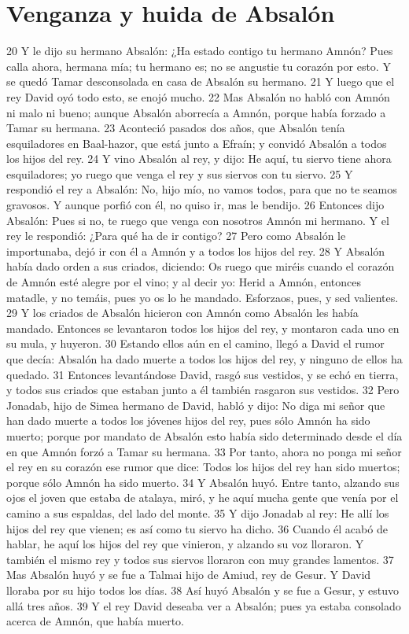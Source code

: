 \section*{Venganza y huida de Absalón}

20 Y le dijo su hermano Absalón: ¿Ha estado contigo tu hermano Amnón? Pues calla ahora, hermana mía; tu hermano es; no se angustie tu corazón por esto. Y se quedó Tamar desconsolada en casa de Absalón su hermano.
21 Y luego que el rey David oyó todo esto, se enojó mucho.
22 Mas Absalón no habló con Amnón ni malo ni bueno; aunque Absalón aborrecía a Amnón, porque había forzado a Tamar su hermana.
23 Aconteció pasados dos años, que Absalón tenía esquiladores en Baal-hazor, que está junto a Efraín; y convidó Absalón a todos los hijos del rey.
24 Y vino Absalón al rey, y dijo: He aquí, tu siervo tiene ahora esquiladores; yo ruego que venga el rey y sus siervos con tu siervo.
25 Y respondió el rey a Absalón: No, hijo mío, no vamos todos, para que no te seamos gravosos. Y aunque porfió con él, no quiso ir, mas le bendijo.
26 Entonces dijo Absalón: Pues si no, te ruego que venga con nosotros Amnón mi hermano. Y el rey le respondió: ¿Para qué ha de ir contigo?
27 Pero como Absalón le importunaba, dejó ir con él a Amnón y a todos los hijos del rey.
28 Y Absalón había dado orden a sus criados, diciendo: Os ruego que miréis cuando el corazón de Amnón esté alegre por el vino; y al decir yo: Herid a Amnón, entonces matadle, y no temáis, pues yo os lo he mandado. Esforzaos, pues, y sed valientes.
29 Y los criados de Absalón hicieron con Amnón como Absalón les había mandado. Entonces se levantaron todos los hijos del rey, y montaron cada uno en su mula, y huyeron.
30 Estando ellos aún en el camino, llegó a David el rumor que decía: Absalón ha dado muerte a todos los hijos del rey, y ninguno de ellos ha quedado.
31 Entonces levantándose David, rasgó sus vestidos, y se echó en tierra, y todos sus criados que estaban junto a él también rasgaron sus vestidos.
32 Pero Jonadab, hijo de Simea hermano de David, habló y dijo: No diga mi señor que han dado muerte a todos los jóvenes hijos del rey, pues sólo Amnón ha sido muerto; porque por mandato de Absalón esto había sido determinado desde el día en que Amnón forzó a Tamar su hermana.
33 Por tanto, ahora no ponga mi señor el rey en su corazón ese rumor que dice: Todos los hijos del rey han sido muertos; porque sólo Amnón ha sido muerto.
34 Y Absalón huyó. Entre tanto, alzando sus ojos el joven que estaba de atalaya, miró, y he aquí mucha gente que venía por el camino a sus espaldas, del lado del monte.
35 Y dijo Jonadab al rey: He allí los hijos del rey que vienen; es así como tu siervo ha dicho.
36 Cuando él acabó de hablar, he aquí los hijos del rey que vinieron, y alzando su voz lloraron. Y también el mismo rey y todos sus siervos lloraron con muy grandes lamentos.
37 Mas Absalón huyó y se fue a Talmai hijo de Amiud, rey de Gesur. Y David lloraba por su hijo todos los días.
38 Así huyó Absalón y se fue a Gesur, y estuvo allá tres años.
39 Y el rey David deseaba ver a Absalón; pues ya estaba consolado acerca de Amnón, que había muerto.

